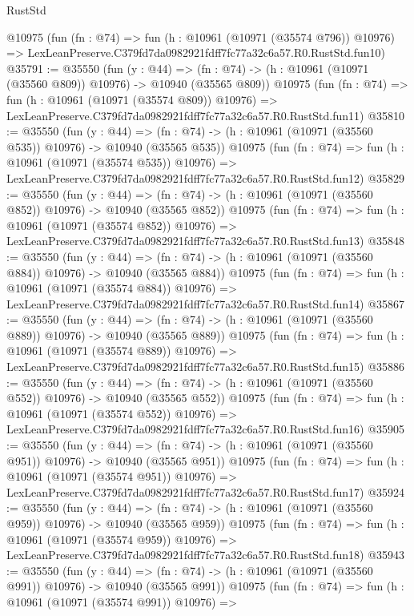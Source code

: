 \begin{lexlean}{RustStd}
\begin{coremodule}
    @10975
    (fun (fn : @74) =>
    fun (h : @10961 (@10971 (@35574 @796)) @10976) =>
    LexLeanPreserve.C379fd7da0982921fdff7fc77a32c6a57.R0.RustStd.fun10)
@35791 := @35550
    (fun (y : @44) =>
    (fn : @74) -> (h : @10961 (@10971 (@35560 @809)) @10976) -> @10940 (@35565 @809))
    @10975
    (fun (fn : @74) =>
    fun (h : @10961 (@10971 (@35574 @809)) @10976) =>
    LexLeanPreserve.C379fd7da0982921fdff7fc77a32c6a57.R0.RustStd.fun11)
@35810 := @35550
    (fun (y : @44) =>
    (fn : @74) -> (h : @10961 (@10971 (@35560 @535)) @10976) -> @10940 (@35565 @535))
    @10975
    (fun (fn : @74) =>
    fun (h : @10961 (@10971 (@35574 @535)) @10976) =>
    LexLeanPreserve.C379fd7da0982921fdff7fc77a32c6a57.R0.RustStd.fun12)
@35829 := @35550
    (fun (y : @44) =>
    (fn : @74) -> (h : @10961 (@10971 (@35560 @852)) @10976) -> @10940 (@35565 @852))
    @10975
    (fun (fn : @74) =>
    fun (h : @10961 (@10971 (@35574 @852)) @10976) =>
    LexLeanPreserve.C379fd7da0982921fdff7fc77a32c6a57.R0.RustStd.fun13)
@35848 := @35550
    (fun (y : @44) =>
    (fn : @74) -> (h : @10961 (@10971 (@35560 @884)) @10976) -> @10940 (@35565 @884))
    @10975
    (fun (fn : @74) =>
    fun (h : @10961 (@10971 (@35574 @884)) @10976) =>
    LexLeanPreserve.C379fd7da0982921fdff7fc77a32c6a57.R0.RustStd.fun14)
@35867 := @35550
    (fun (y : @44) =>
    (fn : @74) -> (h : @10961 (@10971 (@35560 @889)) @10976) -> @10940 (@35565 @889))
    @10975
    (fun (fn : @74) =>
    fun (h : @10961 (@10971 (@35574 @889)) @10976) =>
    LexLeanPreserve.C379fd7da0982921fdff7fc77a32c6a57.R0.RustStd.fun15)
@35886 := @35550
    (fun (y : @44) =>
    (fn : @74) -> (h : @10961 (@10971 (@35560 @552)) @10976) -> @10940 (@35565 @552))
    @10975
    (fun (fn : @74) =>
    fun (h : @10961 (@10971 (@35574 @552)) @10976) =>
    LexLeanPreserve.C379fd7da0982921fdff7fc77a32c6a57.R0.RustStd.fun16)
@35905 := @35550
    (fun (y : @44) =>
    (fn : @74) -> (h : @10961 (@10971 (@35560 @951)) @10976) -> @10940 (@35565 @951))
    @10975
    (fun (fn : @74) =>
    fun (h : @10961 (@10971 (@35574 @951)) @10976) =>
    LexLeanPreserve.C379fd7da0982921fdff7fc77a32c6a57.R0.RustStd.fun17)
@35924 := @35550
    (fun (y : @44) =>
    (fn : @74) -> (h : @10961 (@10971 (@35560 @959)) @10976) -> @10940 (@35565 @959))
    @10975
    (fun (fn : @74) =>
    fun (h : @10961 (@10971 (@35574 @959)) @10976) =>
    LexLeanPreserve.C379fd7da0982921fdff7fc77a32c6a57.R0.RustStd.fun18)
@35943 := @35550
    (fun (y : @44) =>
    (fn : @74) -> (h : @10961 (@10971 (@35560 @991)) @10976) -> @10940 (@35565 @991))
    @10975
    (fun (fn : @74) =>
    fun (h : @10961 (@10971 (@35574 @991)) @10976) =>

\end{coremodule}
\end{lexlean}
